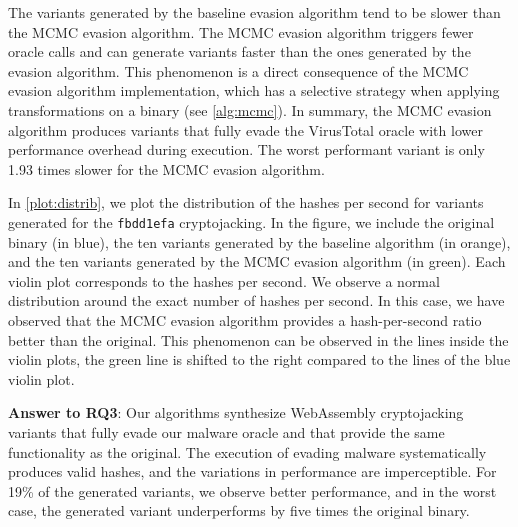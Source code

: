 The variants generated by the baseline evasion algorithm tend to be slower than the MCMC evasion algorithm.
The MCMC evasion algorithm triggers fewer oracle calls and can generate variants faster than the ones generated by the evasion algorithm.
This phenomenon is a direct consequence of the MCMC evasion algorithm implementation, which has a selective strategy when applying transformations on a binary  (see \autoref{alg:mcmc}).
In summary, the MCMC evasion algorithm produces variants that fully evade the VirusTotal oracle with lower performance overhead during execution. The worst performant variant is only 1.93 times slower for the MCMC evasion algorithm.


In \autoref{plot:distrib}, we plot the distribution of the hashes per second for variants generated for the  \texttt{fbdd1efa} cryptojacking.
In the figure, we include the original binary (in blue), the ten variants generated by the baseline algorithm (in orange), and the ten variants generated by the MCMC evasion algorithm (in green). 
Each violin plot corresponds to the hashes per second.
We observe a normal distribution around the exact number of hashes per second. 
In this case, we have observed that the MCMC evasion algorithm provides a hash-per-second ratio better than the original.
This phenomenon can be observed in the lines inside the violin plots, the green line is shifted to the right compared to the lines of the blue violin plot.

\begin{tcolorbox}[boxrule=1pt,arc=.3em,boxsep=-1.3mm]
  \textbf{Answer to RQ3}: 
   Our algorithms synthesize WebAssembly cryptojacking variants that fully evade our malware oracle and that provide the same functionality as the original. The execution of evading malware systematically produces valid hashes, and the variations in performance are imperceptible. For 19\% of the generated
variants, we observe better performance, and in the
worst case, the generated variant underperforms by five
times the original binary.
\end{tcolorbox}





